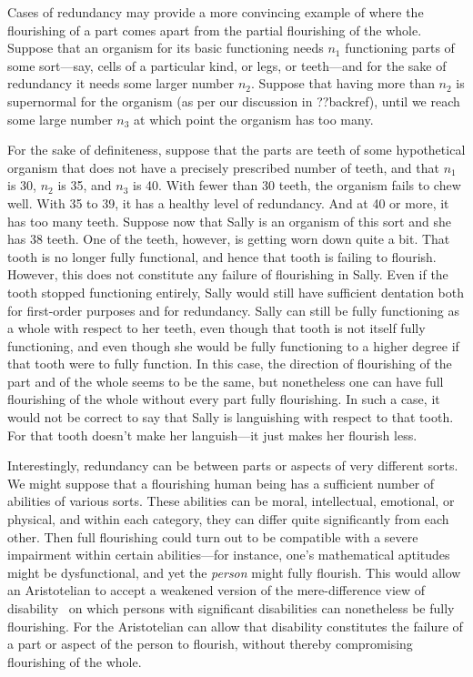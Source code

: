 Cases of redundancy may provide a more convincing example of where the flourishing of a part comes apart from
the partial flourishing of the whole. Suppose that an organism for its basic functioning needs $n_1$ functioning parts of some sort---say,
cells of a particular kind, or legs, or teeth---and for the sake of redundancy it needs some larger number $n_2$.
Suppose that having more than $n_2$ is supernormal for the organism (as per our discussion in ??backref), until we
reach some large number $n_3$ at which point the organism has too many.  

For the sake of definiteness, suppose that the parts are teeth of some hypothetical organism that does not
have a precisely prescribed number of teeth, and that $n_1$ is 30, $n_2$ is 35, and $n_3$ is 40. With fewer
than 30 teeth, the organism fails to chew well. With 35 to 39, it has a healthy level of redundancy. And at 40 or more,
it has too many teeth. Suppose now that Sally is an organism of this sort and she has 38 teeth. One of the teeth, however,
is getting worn down quite a bit. That tooth is no longer fully functional, and hence that tooth is failing to flourish.
However, this does not constitute any failure of flourishing in Sally. Even if the tooth stopped functioning entirely,
Sally would still have sufficient dentation both for first-order purposes and for redundancy. Sally can still be fully
functioning as a whole with respect to her teeth, even though that tooth is not itself fully functioning, and even though
she would be fully functioning to a higher degree if that tooth were to fully function. In this case, the direction of
flourishing of the part and of the whole seems to be the same, but nonetheless one can have full flourishing of the whole
without every part fully flourishing. In such a case, it would not be correct to say that Sally is languishing with respect
to that tooth. For that tooth doesn't make her languish---it just makes her flourish less.

Interestingly, redundancy can be between parts or aspects of very different sorts. We might suppose that a flourishing human 
being has a sufficient number of abilities of various sorts. These abilities can be moral, intellectual, emotional, or physical, and
within each category, they can differ quite significantly from each other. Then full flourishing could turn out to be compatible with a severe
impairment within certain abilities---for instance, one's mathematical aptitudes might be dysfunctional, and yet the \textit{person} 
might fully flourish. This would allow an Aristotelian to accept a weakened version of the mere-difference view
of disability~\parencite{BarnesDisability} on which persons with significant disabilities can nonetheless
be fully flourishing. For the Aristotelian can allow that disability constitutes the failure of a part or aspect 
of the person to flourish, without thereby compromising flourishing of the whole. 

